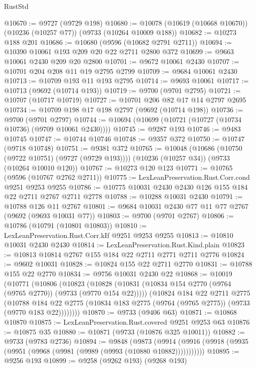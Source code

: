 \begin{lexlean}{RustStd}
\begin{coremodule}
@10670 := @9727 (@9729 @198)
@10680 := @10078 (@10619 (@10668 @10670)) (@10236 (@10257 @77)) (@9733 (@10264 @10009 @188))
@10682 := @10273 @188 @201
@10686 := @10680 (@9596 (@10682 @2791 @2711))
@10694 := @10390 @10061 @193 @209 @20 @22 @2711 @2800 @372
@10699 := @9663 @10061 @2430 @209 @20 @2800
@10701 := @9672 @10061 @2430
@10707 := @10701 @204 @208 @11 @19 @2795 @2799
@10709 := @9684 @10061 @2430
@10713 := @10709 @193 @11 @193 @2795
@10714 := @9693 @10061
@10717 := @10713 (@9692 (@10714 @193))
@10719 := @9700 (@9701 @2795)
@10721 := @10707 (@10717 @10719)
@10727 := @10701 @206 @82 @17 @14 @2797 @2695
@10734 := @10709 @198 @17 @198 @2797 (@9692 (@10714 @198))
@10736 := @9700 (@9701 @2797)
@10744 := @10694 (@10699 (@10721 (@10727 (@10734 @10736) (@9709 @10061 @2430))))
@10745 := @9287 @193
@10746 := @9483 @10745
@10747 := @10744 @10746
@10748 := @9357 @372
@10750 := @10747 (@9718 @10748)
@10751 := @9381 @372
@10765 := @10048
    (@10686 (@10750 (@9722 @10751) (@9727 (@9729 @193))))
    (@10236 (@10257 @34))
    (@9733 (@10264 @10010 @120))
@10767 := @10273 @120 @123
@10771 := @10765 (@9596 (@10767 @2762 @2711))
@10775 := LexLeanPreservation.Rust.Corr.cond @9251 @9253 @9255
@10786 := @10775 @10031 @2430 @2430 @126 @155 @184 @22 @2711 @2767 @2711 @2778
@10788 := @10288 @10031 @2430
@10791 := @10788 @126 @11 @2767
@10801 := @9684 @10031 @2430 @77 @11 @77 @2767 (@9692 (@9693 @10031 @77))
@10803 := @9700 (@9701 @2767)
@10806 := @10786 (@10791 (@10801 @10803))
@10810 := LexLeanPreservation.Rust.Corr.kIf @9251 @9253 @9255
@10813 := @10810 @10031 @2430 @2430
@10814 := LexLeanPreservation.Rust.Kind.plain
@10823 := @10813 @10814 @2767 @155 @184 @22 @2711 @2771 @2711 @2776
@10824 := @9602 @10031
@10828 := @10824 @155 @22 @2711 @2770
@10831 := @10788 @155 @22 @2770
@10834 := @9756 @10031 @2430 @22
@10868 := @10019
    (@10771
      (@10806
        (@10823
          (@10828 (@10831 (@10834 @154 @2770 (@9764 (@9765 @2770)) (@9733 (@9770 @154 @22)))))
          (@10824
            @184
            @22
            @2711
            @2775
            (@10788
              @184
              @22
              @2775
              (@10834 @183 @2775 (@9764 (@9765 @2775)) (@9733 (@9770 @183 @22))))))))
@10870 := @9733 (@9406 @63)
@10871 := @10868 @10870
@10875 := LexLeanPreservation.Rust.covered @9251 @9253 @63
@10876 := @10875 @35
@10880 := @10871 (@9733 (@10876 @325 @10011))
@10882 := @9733 (@9783 @2736)
@10894 := @9848
    (@9873 (@9914 (@9916 (@9918 (@9935 (@9951 (@9968 (@9981 (@9989 (@9993 (@10880 @10882)))))))))))
@10895 := @9256 @193
@10899 := @9258 (@9262 @193) (@9268 @193)

\end{coremodule}
\end{lexlean}
